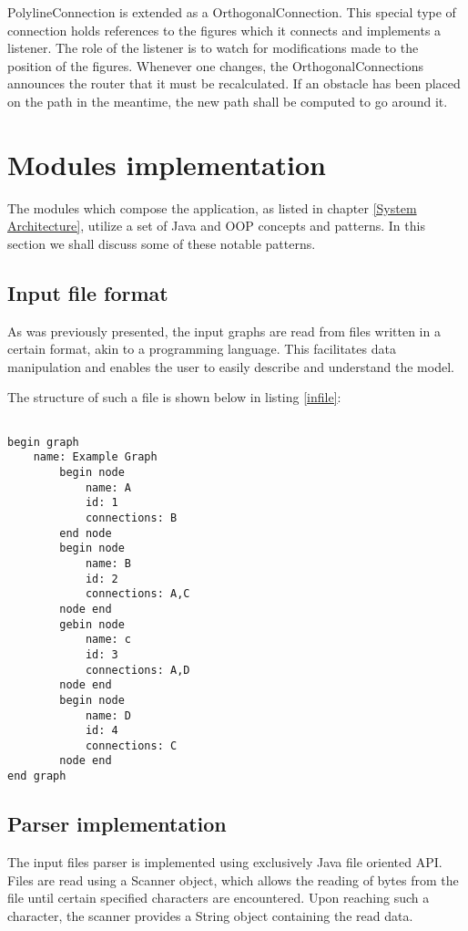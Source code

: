 PolylineConnection is extended as a OrthogonalConnection. This special type of connection holds references to the 
figures which it connects and implements a listener. The role of the listener is to watch for modifications made 
to the position of the figures. Whenever one changes, the OrthogonalConnections announces the router that it 
must be recalculated. If an obstacle has been placed on the path in the meantime, the new path shall be computed 
to go around it.

\section{Modules implementation}

The modules which compose the application, as listed in chapter \ref{System Architecture}, utilize a set of Java 
and OOP concepts and patterns. In this section we shall discuss some of these notable patterns.

\subsection{Input file format}

As was previously presented, the input graphs are read from files written in a certain format, akin to a programming 
language. This facilitates data manipulation and enables the user to easily describe and understand the model. 

The structure of such a file is shown below in listing \ref{infile}:

\begin{lstlisting}[caption=Input file example \label{infile}]

begin graph
    name: Example Graph
        begin node
            name: A
            id: 1
            connections: B
        end node
        begin node
            name: B
            id: 2
            connections: A,C
        node end
        gebin node
            name: c
            id: 3
            connections: A,D
        node end
       	begin node
            name: D
            id: 4
            connections: C
        node end
end graph

\end{lstlisting}

\subsection{Parser implementation}

The input files parser is implemented using exclusively Java file oriented API. Files are read using a Scanner object, 
which allows the reading of bytes from the file until certain specified characters are encountered. Upon reaching 
such a character, the scanner provides a String object containing the read data. 

